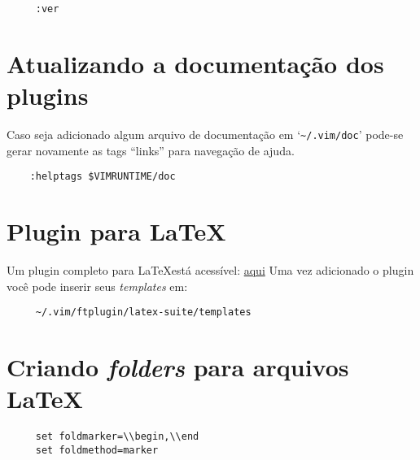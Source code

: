 \begin{verbatim}
     :ver
\end{verbatim}

\section{Atualizando a documentação dos plugins}
\label{sec:Atualizando a documentação dos plugins}

Caso seja adicionado algum arquivo de documentação em `\verb+~/.vim/doc+' pode-se 
gerar novamente as tags ``links'' para navegação de ajuda.

\begin{verbatim}
    :helptags $VIMRUNTIME/doc
\end{verbatim}


\section{Plugin para \LaTeX}
\label{Plugin para LaTeX}

Um plugin completo para \LaTeX está acessível:
\href{http://vim-latex.sourceforge.net/}{aqui} Uma vez adicionado o plugin você pode
inserir seus {\em templates} em:

\begin{verbatim}
     ~/.vim/ftplugin/latex-suite/templates
\end{verbatim}


\section{Criando {\em folders} para arquivos \LaTeX}
\label{Criando folders para arquivos LaTeX}

\begin{verbatim}
     set foldmarker=\\begin,\\end
     set foldmethod=marker
\end{verbatim}

